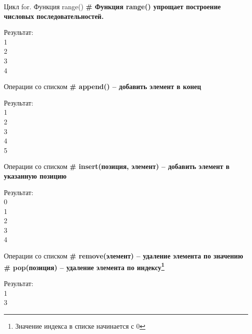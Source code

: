 \documentclass[12pt]{beamer}
\begin{document}
\begin{frame}{Цикл for. Функция range()}
\textbf{\# Функция \textbf{range()} упрощает построение числовых последовательностей.}
\vspace{0.5cm}

\vspace{0.5cm}
Результат: \\
1 \\
2 \\
3 \\
4 \\
\end{frame}


\begin{frame}{Операции со списком}
\textbf{\# append() -- добавить элемент в конец} 
\vspace{0.5cm}

\vspace{0.5cm}
Результат: \\
1 \\
2 \\
3 \\
4 \\
5 \\
\end{frame}


\begin{frame}{Операции со списком}
\textbf{\# insert(позиция, элемент) -- добавить элемент в указанную позицию} 
\vspace{0.5cm}

\vspace{0.5cm}
Результат: \\
0 \\
1 \\
2 \\
3 \\
4 \\
\end{frame}


\begin{frame}{Операции со списком}
\textbf{\# remove(элемент) -- удаление элемента по значению} \\
\textbf{\# pop(позиция) -- удаление элемента по индексу\footnote{Значение индекса в списке начинается с 0}} 
\vspace{0.5cm}

\vspace{0.5cm}
Результат: \\
1 \\
3 \\
\end{frame}
\end{document}
